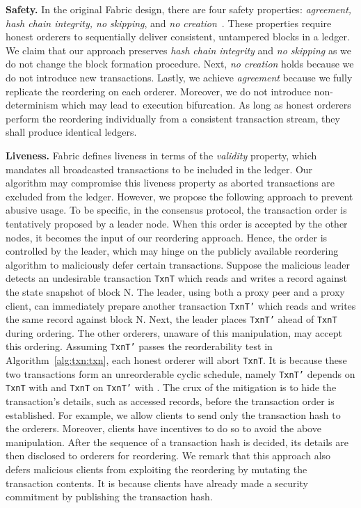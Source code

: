 \textbf{Safety.} 
In the original Fabric design, there are four safety properties: \textit{agreement, hash chain integrity, no skipping}, and \textit{no creation}~\cite{androulaki2018hyperledger}. 
%
These properties require honest orderers to sequentially deliver consistent, untampered blocks in a ledger.
%
We claim that our approach preserves \textit{hash chain integrity} and \textit{no skipping} as we do not change the block formation procedure.
%
Next, \textit{no creation} holds because we do not introduce new transactions. 
%
Lastly, we achieve \textit{agreement} because we fully replicate the reordering on each orderer.
%
Moreover, we do not introduce non-determinism which may lead to execution bifurcation. 
%
As long as honest orderers perform the reordering individually from a consistent transaction stream, they shall produce identical ledgers. 

\textbf{Liveness.} 
Fabric defines liveness in terms of the \textit{validity} property, which mandates all broadcasted transactions to be included in the ledger. 
%
Our algorithm may compromise this liveness property as aborted transactions are excluded from the ledger. 
%
However, we propose the following approach to prevent abusive usage. 
%
To be specific, in the consensus protocol, the transaction order is tentatively proposed by a leader node. 
%
When this order is accepted by the other nodes, it becomes the input of our reordering approach. 
%
Hence, the order is controlled by the leader, which may hinge on the publicly available reordering algorithm to maliciously defer certain transactions.
% 
Suppose the malicious leader detects an undesirable transaction \texttt{TxnT} which reads and writes a record against the state snapshot of block N. 
%
The leader, using both a proxy peer and a proxy client, can immediately prepare another transaction \texttt{TxnT'} which reads and writes the same record against block N. 
%
Next, the leader places \texttt{TxnT'} ahead of \texttt{TxnT} during ordering. 
%
The other orderers, unaware of this manipulation, may accept this ordering.
% 
Assuming \texttt{TxnT'} passes the reorderability test in Algorithm~\ref{alg:txn:txn}, each honest orderer will abort \texttt{TxnT}.
%
It is because these two transactions form an unreorderable cyclic schedule, namely \texttt{TxnT'} depends on \texttt{TxnT} with  and \texttt{TxnT} on \texttt{TxnT'} with .
%
The crux of the mitigation is to hide the transaction's details, such as accessed records, before the transaction order is established. 
%
For example, we allow clients to send only the transaction hash to the orderers.
%
Moreover, clients have incentives to do so to avoid the above manipulation.
%
After the sequence of a transaction hash is decided, its details are then disclosed to orderers for reordering. 
%
We remark that this approach also defers malicious clients from exploiting the reordering by mutating the transaction contents.
%
It is because clients have already made a security commitment by publishing the transaction hash. 


